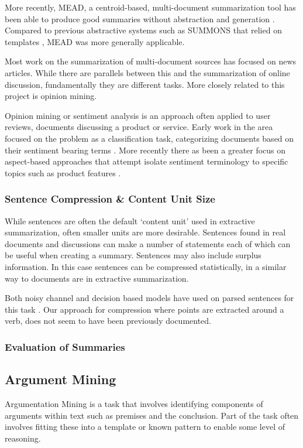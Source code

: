         More recently, MEAD, a centroid-based, multi-document summarization tool has been able to produce good summaries without abstraction and generation \cite{radev2000centroid}. Compared to previous abstractive systems such as SUMMONS that relied on templates \cite{mckeown1995generating}, MEAD was more generally applicable.

        Most work on the summarization of multi-document sources has focused on news articles. While there are parallels between this and the summarization of online discussion, fundamentally they are different tasks. More closely related to this project is opinion mining.

        Opinion mining or sentiment analysis is an approach often applied to user reviews, documents discussing a product or service. Early work in the area focused on the problem as a classification task, categorizing documents based on their sentiment bearing terms \cite{turney2002thumbs}. More recently there as been a greater focus on aspect-based approaches that attempt isolate sentiment terminology to specific topics such as product features \cite{hu2004mining}.

      \subsubsection{Sentence Compression \& Content Unit Size}
        While sentences are often the default `content unit' used in extractive summarization, often smaller units are more desirable. Sentences found in real documents and discussions can make a number of statements each of which can be useful when creating a summary. Sentences may also include surplus information. In this case sentences can be compressed statistically, in a similar way to documents are in extractive summarization.

        Both noisy channel and decision based models have used on parsed sentences for this task \cite{knight2000statistics}. Our approach for compression where points are extracted around a verb, does not seem to have been previously documented.


      \subsubsection{Evaluation of Summaries}

    \subsection{Argument Mining}
      Argumentation Mining is a task that involves identifying components of arguments within text such as premises and the conclusion. Part of the task often involves fitting these into a template or known pattern to enable some level of reasoning.
